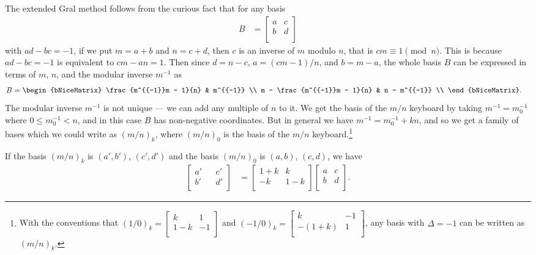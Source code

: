 \documentclass[a4paper,11pt]{article}
\begin{document}
The extended Gral method follows from the curious fact that for any basis
\begin{align}
B
    &=
\begin{bmatrix}
    a   &   c   \\
    b   &   d   \\
\end{bmatrix}
\end{align}
with $ad-bc = -1$, if we put $m = a + b$ and $n = c + d$, then $c$ is an
inverse of $m$ modulo $n$, that is $c m \equiv 1 \pmod n$. This is because
$ad-bc = -1$ is equivalent to $cm - an = 1$. Then since $d = n - c$, $a =
(cm-1)/n$, and $b = m - a$, the whole basis $B$ can be expressed in terms of
$m$, $n$, and the modular inverse $m^{-1}$ as
\bgroup
{}
\begin{align}
B
    &=
\begin{bNiceMatrix}
\frac{m^{{-1}}m - 1}{n}       &   m^{{-1}}  \\
m - \frac{m^{{-1}}m - 1}{n}   &   n - m^{{-1}}  \\
\end{bNiceMatrix}.
\end{align}
\egroup
The modular inverse $m^{-1}$ is not unique --- we can add any multiple of $n$
to it. We get the basis of the $m/n$ keyboard by taking $m^{-1} = m^{-1}_0$
where $0 \leq m^{-1}_0 < n$, and in this case $B$ has non-negative coordinates.
But in general we have $m^{-1} = m^{-1}_0 + k n$, and so we get a family of
bases which we could write as $(m/n)_k$, where $(m/n)_0$ is the basis of the
$m/n$ keyboard.\footnote{With the conventions that
$
(1/0)_k
    =
\begin{bmatrix}
    k       &   1   \\
    1 - k   &   -1  \\
\end{bmatrix}
$
and
$
(-1/0)_k
    =
\begin{bmatrix}
    k           &   -1   \\
    -(1 + k)    &   1  \\
\end{bmatrix}
$,
any basis with $\Delta = -1$ can be written as $(m/n)_k$.
}

If the basis $(m/n)_k$ is $(a', b')$, $(c', d')$ and the basis $(m/n)_0$ is
$(a, b)$, $(c, d)$, we have
\begin{align}
\begin{bmatrix}
    a'  &&  c'  \\
    b'  &&  d'  \\
\end{bmatrix}
    &=
\begin{bmatrix}
    1 + k   &   k       \\
    -k      &   1 - k   \\
\end{bmatrix}
\begin{bmatrix}
    a   &   c   \\
    b   &   d   \\
\end{bmatrix}.
\end{align}
\end{document}
